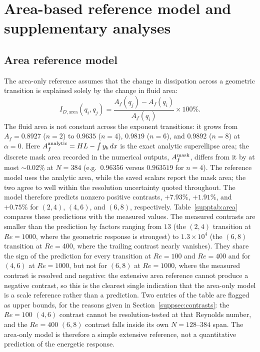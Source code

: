 \section{Area-based reference model and supplementary analyses}
\label{suppsec:area}

\subsection{Area reference model}

The area-only reference assumes that the change in dissipation across a geometric transition is explained solely by the change in fluid area:
\begin{equation}
I_{D,\mathrm{area}}(q_i,q_j) = \frac{A_f(q_j)-A_f(q_i)}{A_f(q_i)}\times 100\%.
\end{equation}
The fluid area is not constant across the exponent transitions: it grows from $A_f=0.8927$ ($n=2$) to $0.9635$ ($n=4$), $0.9819$ ($n=6$), and $0.9892$ ($n=8$) at $\alpha=0$. Here $A_f^{\rm analytic}=HL-\int y_b\,dx$ is the exact analytic superellipse area; the discrete mask area recorded in the numerical outputs, $A_f^{\rm mask}$, differs from it by at most $\sim0.02\%$ at $N=384$ (e.g.\ $0.96356$ versus $0.963519$ for $n=4$). The reference model uses the analytic area, while the saved scalars report the mask area; the two agree to well within the resolution uncertainty quoted throughout. The model therefore predicts nonzero positive contrasts, $+7.93\%$, $+1.91\%$, and $+0.75\%$ for $(2,4)$, $(4,6)$, and $(6,8)$, respectively. Table~\ref{supptab:area} compares these predictions with the measured values. The measured contrasts are smaller than the prediction by factors ranging from $13$ (the $(2,4)$ transition at $Re=1000$, where the geometric response is strongest) to $1.3\times10^{4}$ (the $(6,8)$ transition at $Re=400$, where the trailing contrast nearly vanishes). They share the sign of the prediction for every transition at $Re=100$ and $Re=400$ and for $(4,6)$ at $Re=1000$, but not for $(6,8)$ at $Re=1000$, where the measured contrast is resolved and negative: the extensive area reference cannot produce a negative contrast, so this is the clearest single indication that the area-only model is a scale reference rather than a prediction. Two entries of the table are flagged as upper bounds, for the reasons given in Section~\ref{suppsec:contrasts}: the $Re=100$ $(4,6)$ contrast cannot be resolution-tested at that Reynolds number, and the $Re=400$ $(6,8)$ contrast falls inside its own $N=128$--$384$ span. The area-only model is therefore a simple extensive reference, not a quantitative prediction of the energetic response.

